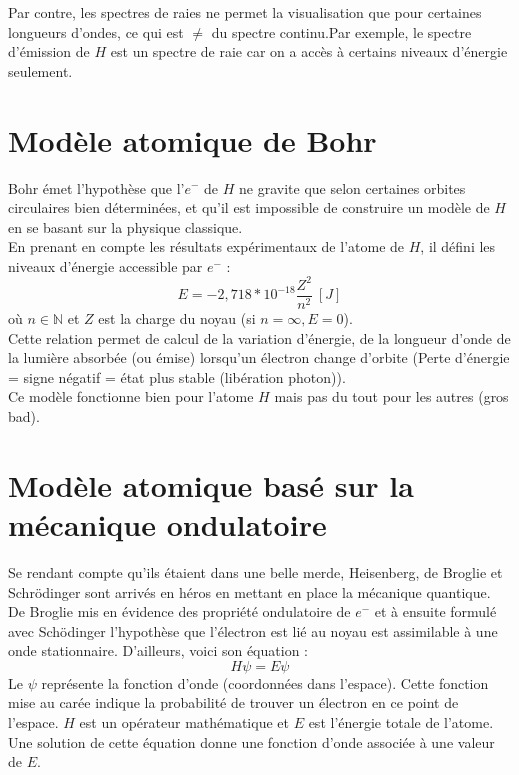 \documentclass[british,french,11pt, a4paper, openany]{book}
\begin{document}
Par contre, les spectres de raies ne permet la visualisation que pour certaines longueurs d'ondes, ce qui est $\neq$ du spectre continu.Par exemple, le spectre d'émission de $H$ est un spectre de raie car on a accès à certains niveaux d'énergie seulement.

\section{Modèle atomique de Bohr}
Bohr émet l'hypothèse que l'$e^-$ de $H$ ne gravite que selon certaines orbites circulaires bien déterminées, et qu'il est impossible de construire un modèle de $H$ en se basant sur la physique classique.\\
En prenant en compte les résultats expérimentaux de l'atome de $H$, il défini les niveaux d'énergie accessible par $e^-$ :
$$E = -2,718*10^{-18} \frac{Z^2}{n^2}\ [J]$$
où $n \in \mathbb{N}$ et $Z$ est la charge du noyau (si $n = \infty, E = 0$).\\
Cette relation permet de calcul de la variation d'énergie, de la longueur d'onde de la lumière absorbée (ou émise) lorsqu'un électron change d'orbite (Perte d'énergie = signe négatif = état plus stable (libération photon)).\\

Ce modèle fonctionne bien pour l'atome $H$ mais pas du tout pour les autres (gros bad).

\section{Modèle atomique basé sur la mécanique ondulatoire}
Se rendant compte qu'ils étaient dans une belle merde, Heisenberg, de Broglie et Schrödinger sont arrivés en héros en mettant en place la mécanique quantique.\\

De Broglie mis en évidence des propriété ondulatoire de $e^-$ et à ensuite formulé avec Schödinger l'hypothèse que l'électron est lié au noyau est assimilable à une onde stationnaire. D'ailleurs, voici son équation  :
$$H\psi = E\psi$$
Le $\psi$ représente la fonction d'onde (coordonnées dans l'espace). Cette fonction mise au carée indique la probabilité de trouver un électron en ce point de l'espace. $H$ est un opérateur mathématique et $E$ est l'énergie totale de l'atome.\\
Une solution de cette équation donne une fonction d'onde associée à une valeur de $E$.\\
\end{document}
